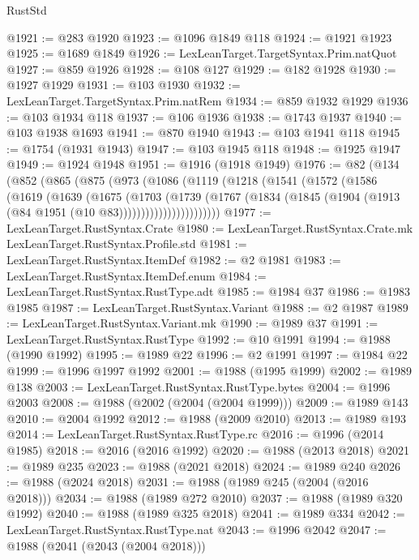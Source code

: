 \begin{lexlean}{RustStd}
\begin{coremodule}
{\begin{coremodule}
{{{{{{{{{{{{{{{{{{{{{{{{{{@1921 := @283 @1920
@1923 := @1096 @1849 @118
@1924 := @1921 @1923
@1925 := @1689 @1849
@1926 := LexLeanTarget.TargetSyntax.Prim.natQuot
@1927 := @859 @1926
@1928 := @108 @127
@1929 := @182 @1928
@1930 := @1927 @1929
@1931 := @103 @1930
@1932 := LexLeanTarget.TargetSyntax.Prim.natRem
@1934 := @859 @1932 @1929
@1936 := @103 @1934 @118
@1937 := @106 @1936
@1938 := @1743 @1937
@1940 := @103 @1938 @1693
@1941 := @870 @1940
@1943 := @103 @1941 @118
@1945 := @1754 (@1931 @1943)
@1947 := @103 @1945 @118
@1948 := @1925 @1947
@1949 := @1924 @1948
@1951 := @1916 (@1918 @1949)
@1976 := @82
    (@134
      (@852
        (@865
          (@875
            (@973
              (@1086
                (@1119
                  (@1218
                    (@1541
                      (@1572
                        (@1586
                          (@1619
                            (@1639
                              (@1675
                                (@1703
                                  (@1739
                                    (@1767
                                      (@1834
                                        (@1845
                                          (@1904 (@1913 (@84 @1951 (@10 @83)))))))))))))))))))))))
@1977 := LexLeanTarget.RustSyntax.Crate
@1980 := LexLeanTarget.RustSyntax.Crate.mk LexLeanTarget.RustSyntax.Profile.std
@1981 := LexLeanTarget.RustSyntax.ItemDef
@1982 := @2 @1981
@1983 := LexLeanTarget.RustSyntax.ItemDef.enum
@1984 := LexLeanTarget.RustSyntax.RustType.adt
@1985 := @1984 @37
@1986 := @1983 @1985
@1987 := LexLeanTarget.RustSyntax.Variant
@1988 := @2 @1987
@1989 := LexLeanTarget.RustSyntax.Variant.mk
@1990 := @1989 @37
@1991 := LexLeanTarget.RustSyntax.RustType
@1992 := @10 @1991
@1994 := @1988 (@1990 @1992)
@1995 := @1989 @22
@1996 := @2 @1991
@1997 := @1984 @22
@1999 := @1996 @1997 @1992
@2001 := @1988 (@1995 @1999)
@2002 := @1989 @138
@2003 := LexLeanTarget.RustSyntax.RustType.bytes
@2004 := @1996 @2003
@2008 := @1988 (@2002 (@2004 (@2004 @1999)))
@2009 := @1989 @143
@2010 := @2004 @1992
@2012 := @1988 (@2009 @2010)
@2013 := @1989 @193
@2014 := LexLeanTarget.RustSyntax.RustType.rc
@2016 := @1996 (@2014 @1985)
@2018 := @2016 (@2016 @1992)
@2020 := @1988 (@2013 @2018)
@2021 := @1989 @235
@2023 := @1988 (@2021 @2018)
@2024 := @1989 @240
@2026 := @1988 (@2024 @2018)
@2031 := @1988 (@1989 @245 (@2004 (@2016 @2018)))
@2034 := @1988 (@1989 @272 @2010)
@2037 := @1988 (@1989 @320 @1992)
@2040 := @1988 (@1989 @325 @2018)
@2041 := @1989 @334
@2042 := LexLeanTarget.RustSyntax.RustType.nat
@2043 := @1996 @2042
@2047 := @1988 (@2041 (@2043 (@2004 @2018)))
}}}}}}}}}}}}}}}}}}}}}}}}}}
\end{coremodule}}
\end{coremodule}
\end{lexlean}

